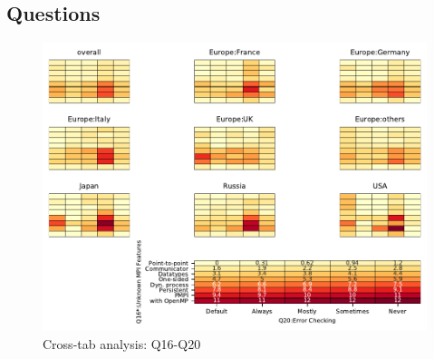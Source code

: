 
\subsection{Questions}


\begin{figure}
\begin{center}
\includegraphics[width=12cm]{../pdfs/Q16-Q20.pdf}
\caption{Cross-tab analysis: Q16-Q20}
\label{fig:Q16-Q20}
\end{center}
\end{figure}
